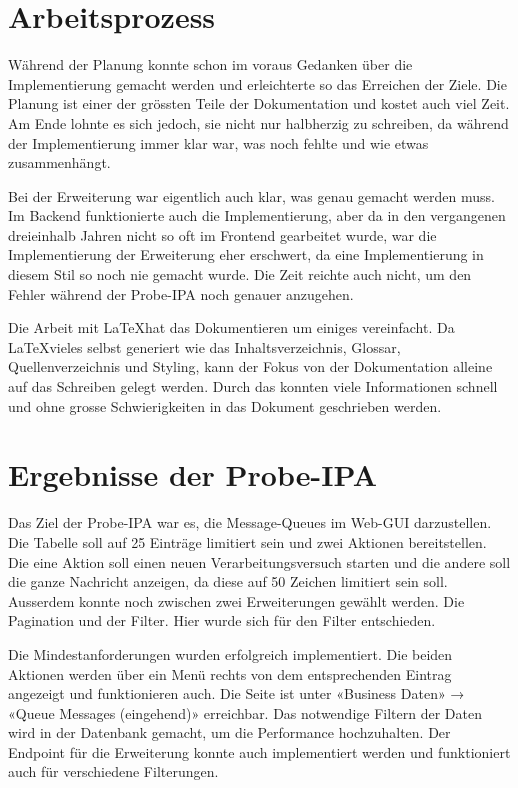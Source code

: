 \section{Arbeitsprozess}
Während der Planung konnte schon im voraus Gedanken über die Implementierung gemacht werden und erleichterte so das Erreichen der Ziele. Die Planung ist einer der grössten Teile der Dokumentation und kostet auch viel Zeit. Am Ende lohnte es sich jedoch, sie nicht nur halbherzig zu schreiben, da während der Implementierung immer klar war, was noch fehlte und wie etwas zusammenhängt.

Bei der Erweiterung war eigentlich auch klar, was genau gemacht werden muss. Im Backend funktionierte auch die Implementierung, aber da in den vergangenen dreieinhalb Jahren nicht so oft im Frontend gearbeitet wurde, war die Implementierung der Erweiterung eher erschwert, da eine Implementierung in diesem Stil so noch nie gemacht wurde. Die Zeit reichte auch nicht, um den Fehler während der Probe-IPA noch genauer anzugehen.

Die Arbeit mit \LaTeX hat das Dokumentieren um einiges vereinfacht. Da \LaTeX vieles selbst generiert wie das Inhaltsverzeichnis, Glossar, Quellenverzeichnis und Styling, kann der Fokus von der Dokumentation alleine auf das Schreiben gelegt werden. Durch das konnten viele Informationen schnell und ohne grosse Schwierigkeiten in das Dokument geschrieben werden.

\section{Ergebnisse der Probe-IPA}
Das Ziel der Probe-IPA war es, die Message-Queues im Web-GUI darzustellen. Die Tabelle soll auf 25 Einträge limitiert sein und zwei Aktionen bereitstellen. Die eine Aktion soll einen neuen Verarbeitungsversuch starten und die andere soll die ganze Nachricht anzeigen, da diese auf 50 Zeichen limitiert sein soll. Ausserdem konnte noch zwischen zwei Erweiterungen gewählt werden. Die Pagination und der Filter. Hier wurde sich für den Filter entschieden.

Die Mindestanforderungen wurden erfolgreich implementiert. Die beiden Aktionen werden über ein Menü rechts von dem entsprechenden Eintrag angezeigt und funktionieren auch. Die Seite ist unter «Business Daten» → «Queue Messages (eingehend)» erreichbar. Das notwendige Filtern der Daten wird in der Datenbank gemacht, um die Performance hochzuhalten. Der Endpoint für die Erweiterung konnte auch implementiert werden und funktioniert auch für verschiedene Filterungen.

